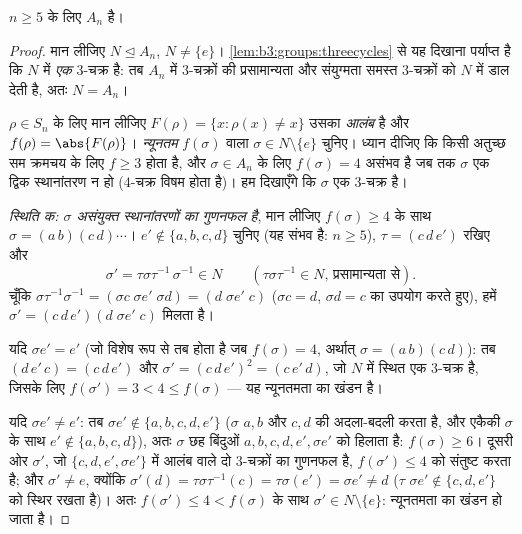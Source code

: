 \begin{theorem}[एकांतर समूह की सरलता]\label{thm:b3:groups:ansimple}
$n \geq 5$ के लिए $A_n$  है।
\end{theorem}

\begin{proof}
मान लीजिए $N \trianglelefteq A_n$, $N \neq \{e\}$। \cref{lem:b3:groups:threecycles} से यह दिखाना पर्याप्त है कि
$N$ में \emph{एक} $3$-चक्र है: तब $A_n$ में $3$-चक्रों की
प्रसामान्यता और संयुग्मता समस्त $3$-चक्रों को $N$ में डाल
देती है, अतः $N = A_n$।

$\rho \in S_n$ के लिए मान लीजिए $F(\rho) = \{x : \rho(x) \neq x\}$ उसका \emph{आलंब} है और $f(\rho) = \abs{F(\rho)}$।
\emph{न्यूनतम} $f(\sigma)$ वाला $\sigma \in N
\setminus \{e\}$ चुनिए। ध्यान दीजिए कि किसी
अतुच्छ सम क्रमचय के लिए $f \geq 3$ होता है, और $\sigma \in A_n$ के लिए $f(\sigma) =
4$
असंभव है जब तक $\sigma$ एक द्विक स्थानांतरण न हो ($4$-चक्र विषम
होता है)। हम दिखाएँगे कि $\sigma$ एक $3$-चक्र है।

\emph{स्थिति क: $\sigma$ असंयुक्त स्थानांतरणों का गुणनफल है},
मान लीजिए $f(\sigma) \geq 4$ के साथ $\sigma = (a\,b)(c\,d)\cdots$। $e'
\notin \{a, b, c, d\}$ चुनिए (यह संभव है: $n \geq 5$),
$\tau =
(c\,d\,e')$ रखिए और
\[
\sigma' = \tau\sigma\tau^{-1}\,\sigma^{-1} \in N
\qquad (\tau\sigma\tau^{-1} \in N \text{, प्रसामान्यता से}).
\]
चूँकि $\sigma\tau^{-1}\sigma^{-1} = (\sigma c\;\sigma e'\;\sigma
d) = (d\;\sigma e'\;c)$ ($\sigma c = d$, $\sigma d = c$ का उपयोग करते हुए), हमें $\sigma' = (c\,d\,e')(d\;\sigma e'\;c)$ मिलता
है।

यदि $\sigma e' = e'$ (जो विशेष रूप से तब होता है जब $f(\sigma) =
4$, अर्थात् $\sigma = (a\,b)(c\,d)$):
तब $(d\,e'\,c) =
(c\,d\,e')$ और $\sigma' = (c\,d\,e')^2 = (c\,e'\,d)$, जो $N$ में स्थित एक $3$-चक्र है, जिसके
लिए $f(\sigma') = 3 < 4 \leq f(\sigma)$ --- यह न्यूनतमता का खंडन है।

यदि $\sigma e' \neq e'$: तब $\sigma e' \notin \{a, b, c, d,
e'\}$ ($\sigma$ $a,b$ और $c,d$ की अदला-बदली करता है,
और एकैकी $\sigma$ के साथ $e' \notin \{a,b,c,d\}$), अतः $\sigma$ छह बिंदुओं $a, b,
c, d, e', \sigma e'$ को
हिलाता है: $f(\sigma) \geq 6$। दूसरी ओर $\sigma'$, जो $\{c, d,
e', \sigma e'\}$ में आलंब वाले दो
$3$-चक्रों का गुणनफल है, $f(\sigma') \leq 4$ को संतुष्ट करता है; और $\sigma' \neq
e$,
क्योंकि $\sigma'(d) = \tau\sigma\tau^{-1}(c) = \tau\sigma(e') =
\sigma e' \neq d$ ($\tau$ $\sigma e' \notin \{c,d,e'\}$ को स्थिर रखता है)। अतः $f(\sigma') \leq 4 <
f(\sigma)$ के साथ
$\sigma' \in N \setminus\{e\}$: न्यूनतमता का खंडन हो जाता है।


\end{proof}
